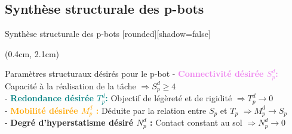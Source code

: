 \documentclass[french]{beamer}
\begin{document}
\subsection{Synthèse structurale des p-bots}
\begin{frame}{Synthèse structurale des p-bots}
[rounded][shadow=false]
{\small %

\begin{textblock*}{12cm}(0.4cm, 2.1cm)
\begin{block}{Paramètres structuraux désirés pour le p-bot}
- \textbf{\textcolor{violet}{Connectivité désirée $S_p^{d}$:}} 
Capacité à la réalisation de la tâche $\Rightarrow S_p^{d} \geq 4$\\

- \textbf{\textcolor{teal}{Redondance désirée $T_p^d$:}} 
Objectif de légèreté et de rigidité $\Rightarrow T_p^d \rightarrow 0$\\

- \textbf{\textcolor{orange}{Mobilité désirée $M_p^d$ :}}
Déduite par la relation entre $S_p$ et $T_p$ $\Rightarrow M_p^{d} \rightarrow S_p$\\

- \textbf{\textcolor{vert}{Degré d'hyperstatisme désiré $N_p^d$ :}}
Contact constant au sol $\Rightarrow N_p^d \rightarrow 0$
\end{block}
\end{textblock*}
}


\end{frame}
\end{document}
